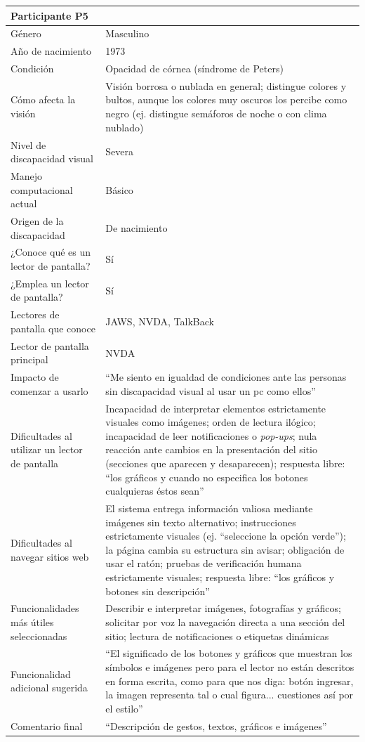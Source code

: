 \begin{longtable}{|p{4cm}|p{10.5cm}|}
    \multicolumn{2}{|l|}{\textbf{Participante P5}} \\
    \hline
    Género & Masculino \\
    \hline
    Año de nacimiento & 1973 \\
    \hline
    Condición & Opacidad de córnea (síndrome de Peters) \\
    \hline
    Cómo afecta la visión & Visión borrosa o nublada en general; distingue colores y bultos, aunque los colores muy oscuros los percibe como negro (ej. distingue semáforos de noche o con clima nublado) \\
    \hline
    Nivel de discapacidad visual & Severa \\
    \hline
    Manejo computacional actual & Básico \\
    \hline
    Origen de la discapacidad & De nacimiento \\
    \hline
    ¿Conoce qué es un lector de pantalla? & Sí \\
    \hline
    ¿Emplea un lector de pantalla? & Sí \\
    \hline
    Lectores de pantalla que conoce & JAWS, NVDA, TalkBack \\
    \hline
    Lector de pantalla principal & NVDA \\
    \hline
    Impacto de comenzar a usarlo & ``Me siento en igualdad de condiciones ante las personas sin discapacidad visual al usar un pc como ellos'' \\
    \hline
    Dificultades al utilizar un lector de pantalla & Incapacidad de interpretar elementos estrictamente visuales como imágenes; orden de lectura ilógico; incapacidad de leer notificaciones o \textit{pop-ups}; nula reacción ante cambios en la presentación del sitio (secciones que aparecen y desaparecen); respuesta libre: ``los gráficos y cuando no especifica los botones cualquieras éstos sean'' \\
    \hline
    Dificultades al navegar sitios web & El sistema entrega información valiosa mediante imágenes sin texto alternativo; instrucciones estrictamente visuales (ej. ``seleccione la opción verde''); la página cambia su estructura sin avisar; obligación de usar el ratón; pruebas de verificación humana estrictamente visuales; respuesta libre: ``los gráficos y botones sin descripción'' \\
    \hline
    Funcionalidades más útiles seleccionadas & Describir e interpretar imágenes, fotografías y gráficos; solicitar por voz la navegación directa a una sección del sitio; lectura de notificaciones o etiquetas dinámicas \\
    \hline
    Funcionalidad adicional sugerida & ``El significado de los botones y gráficos que muestran los símbolos e imágenes pero para el lector no están descritos en forma escrita, como para que nos diga: botón ingresar, la imagen representa tal o cual figura... cuestiones así por el estilo'' \\
    \hline
    Comentario final & ``Descripción de gestos, textos, gráficos e imágenes'' \\
    \hline


\end{longtable}
